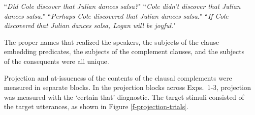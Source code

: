 \documentclass[11pt,fleqn]{article}
\newcommand{\6}{\mbox{$[\hspace*{-.6mm}[$}}
\newcommand{\9}{\mbox{$]\hspace*{-.6mm}]$}}
\begin{document}
\begin{exe}
\ex\label{sample-stims}
\begin{xlist}
 ``{\em Did Cole discover that Julian dances salsa?}"
 ``{\em Cole didn't discover that Julian dances salsa.}"
 ``{\em Perhaps Cole discovered that Julian dances salsa.}"
 ``{\em If Cole discovered that Julian dances salsa, Logan will be joyful.}"
\end{xlist}
\end{exe}
The proper names that realized the speakers, the subjects of the clause-embedding predicates, the subjects of the complement clauses, and the subjects of the consequents  were all unique.

Projection and at-issueness of the contents of the clausal complements were measured in separate blocks. In the projection blocks across Exps.~1-3, projection was measured with the `certain that' diagnostic. The target stimuli consisted of the target utterances, as shown in Figure \ref{f-projection-trials}.
\end{document}
